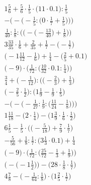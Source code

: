 \documentclass[8pt]{article}
\begin{document}
\begin{align}
1\frac{5}{6} + \frac{5}{6} \cdot \frac{1}{5} \cdot \big(11 \cdot 0.1\big) : \frac{1}{5} \\
-\bigg(-\Big(-\frac{1}{5} : \big(0 \cdot \frac{1}{7} + \frac{1}{5}\big)\Big)\bigg) \\
\frac{1}{40} : \frac{1}{8} : \bigg(\Big(-\big(-\frac{13}{40}\big) + \frac{1}{8}\Big)\bigg) \\
3\frac{33}{35} \cdot \frac{1}{6} + \frac{2}{35} + \frac{1}{7} - \big(-\frac{1}{7}\big) \\
\big(-1\frac{11}{12} - \frac{1}{6}\big) + \frac{1}{4} - \big(\frac{2}{5} + 0.1\big) \\
\Big(-9\Big) \cdot \Big(\frac{1}{72} : \big(\frac{10}{32} \cdot 0.1 : \frac{1}{4}\big)\Big) \\
\frac{3}{4} + \Big(-\frac{1}{12}\Big) : \Big(\big(-\frac{2}{3}\big) + \frac{1}{3}\Big) \\
\big(-\frac{2}{5} \cdot \frac{1}{2}\big) : \big(1\frac{1}{9} - \frac{1}{9} \cdot \frac{1}{5}\big) \\
-\bigg(-\Big(-\frac{1}{27} : \frac{1}{9} : \big(\frac{11}{24} - \frac{1}{8}\big)\Big)\bigg) \\
1\frac{11}{18} - \big(2 \cdot \frac{1}{4}\big) - \big(1\frac{3}{9} \cdot \frac{1}{6} \cdot \frac{1}{2}\big) \\
6\frac{1}{5} - \frac{1}{5} \cdot \Big(\big(-\frac{5}{18}\big) + \frac{7}{9} \cdot \frac{1}{7}\Big) \\
-\frac{5}{56} + \frac{1}{8} : \frac{1}{7} : \big(3\frac{1}{3} \cdot 0.1\big) + \frac{1}{4} \\
\Big(-9\Big) \cdot \Big(\frac{1}{72} : \big(\frac{25}{72} - \frac{1}{3} + \frac{1}{9}\big)\Big) \\
\Big(-\big(-1\frac{1}{2}\big)\Big) - \Big(28 \cdot \frac{1}{8} \cdot \frac{1}{7}\Big) \\
4\frac{7}{8} - \big(-\frac{1}{64} : \frac{1}{8}\big) \cdot \big(1\frac{2}{5} \cdot \frac{1}{7}\big)
\end{align}
\end{document}
